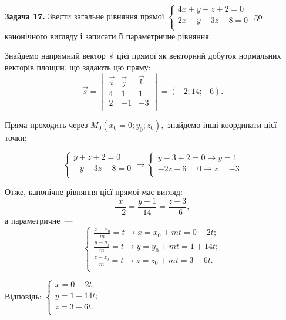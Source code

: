 \documentclass[14pt,draft]{extreport}
\begin{document}
\bigskip \textbf{Задача 17.} Звести загальне рівняння прямої
$\begin{cases}
	4x+y+z+2=0\\
	2x-y-3z-8=0\\
\end{cases}$
до канонічного вигляду і записати її параметричне
рівняння.\bigskip

%

Знайдемо напрямний вектор $\vec s$ цієї прямої
як векторний добуток нормальних векторів площин,
що задають цю пряму:
\begin{equation}
	\vec s = \begin{vmatrix}
		\vec i & \vec j & \vec k\\
		4 & 1 & 1\\
		2 & -1 & -3\\
	\end{vmatrix}
	=(-2;14;-6).
\end{equation}

Пряма проходить через $M_0(x_0=0;y_0;z_0),$
знайдемо інші координати цієї точки:

\begin{equation}
\begin{cases}
	y+z+2=0\\
	-y-3z-8=0\\
\end{cases}
\to
\begin{cases}
	y-3+2=0\to y=1\\
	-2z-6=0\to z=-3\\
\end{cases}
\end{equation}

Отже, канонічне рівняння цієї прямої має вигляд:
\begin{equation}
	\frac{x}{-2}=\frac{y-1}{14}=\frac{z+3}{-6},
\end{equation}
а параметричне~---
\begin{equation}
	\begin{cases}
		\frac{x-x_0}{m}=t\to x=x_0+mt=0-2t;\\
		\frac{y-y_0}{m}=t\to y=y_0+mt=1+14t;\\
		\frac{z-z_0}{m}=t\to z=z_0+mt=3-6t.\\
	\end{cases}
\end{equation}

\null\hfill
\begin{boxedminipage}{0.34\textwidth}
	Відповідь:
	$
	\begin{cases}
		x=0-2t;\\
		y=1+14t;\\
		z=3-6t.\\
	\end{cases}
	$
\end{boxedminipage}
\end{document}
